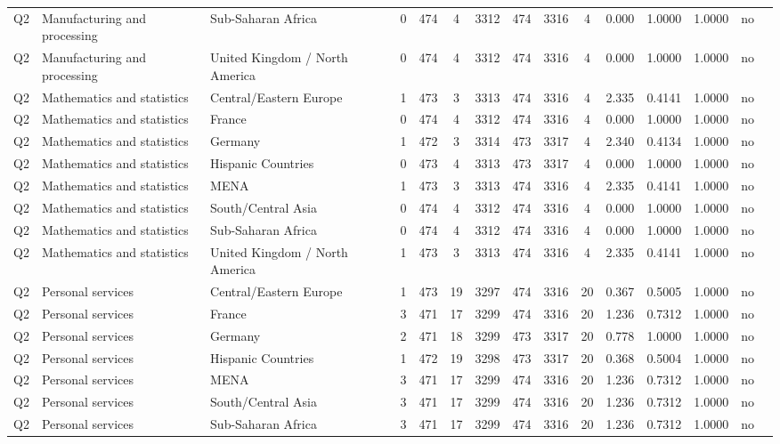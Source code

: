 \begin{longtable}{lllrcccccccccll}
Q2 & Manufacturing and processing & Sub-Saharan Africa & 0 & 474 & 4 & 3312 & 474 & 3316 & 4 & 0.000 & 1.0000 & 1.0000 & no \\
Q2 & Manufacturing and processing & United Kingdom / North America & 0 & 474 & 4 & 3312 & 474 & 3316 & 4 & 0.000 & 1.0000 & 1.0000 & no \\
Q2 & Mathematics and statistics & Central/Eastern Europe & 1 & 473 & 3 & 3313 & 474 & 3316 & 4 & 2.335 & 0.4141 & 1.0000 & no \\
Q2 & Mathematics and statistics & France & 0 & 474 & 4 & 3312 & 474 & 3316 & 4 & 0.000 & 1.0000 & 1.0000 & no \\
Q2 & Mathematics and statistics & Germany & 1 & 472 & 3 & 3314 & 473 & 3317 & 4 & 2.340 & 0.4134 & 1.0000 & no \\
Q2 & Mathematics and statistics & Hispanic Countries & 0 & 473 & 4 & 3313 & 473 & 3317 & 4 & 0.000 & 1.0000 & 1.0000 & no \\
Q2 & Mathematics and statistics & MENA & 1 & 473 & 3 & 3313 & 474 & 3316 & 4 & 2.335 & 0.4141 & 1.0000 & no \\
Q2 & Mathematics and statistics & South/Central Asia & 0 & 474 & 4 & 3312 & 474 & 3316 & 4 & 0.000 & 1.0000 & 1.0000 & no \\
Q2 & Mathematics and statistics & Sub-Saharan Africa & 0 & 474 & 4 & 3312 & 474 & 3316 & 4 & 0.000 & 1.0000 & 1.0000 & no \\
Q2 & Mathematics and statistics & United Kingdom / North America & 1 & 473 & 3 & 3313 & 474 & 3316 & 4 & 2.335 & 0.4141 & 1.0000 & no \\
Q2 & Personal services & Central/Eastern Europe & 1 & 473 & 19 & 3297 & 474 & 3316 & 20 & 0.367 & 0.5005 & 1.0000 & no \\
Q2 & Personal services & France & 3 & 471 & 17 & 3299 & 474 & 3316 & 20 & 1.236 & 0.7312 & 1.0000 & no \\
Q2 & Personal services & Germany & 2 & 471 & 18 & 3299 & 473 & 3317 & 20 & 0.778 & 1.0000 & 1.0000 & no \\
Q2 & Personal services & Hispanic Countries & 1 & 472 & 19 & 3298 & 473 & 3317 & 20 & 0.368 & 0.5004 & 1.0000 & no \\
Q2 & Personal services & MENA & 3 & 471 & 17 & 3299 & 474 & 3316 & 20 & 1.236 & 0.7312 & 1.0000 & no \\
Q2 & Personal services & South/Central Asia & 3 & 471 & 17 & 3299 & 474 & 3316 & 20 & 1.236 & 0.7312 & 1.0000 & no \\
Q2 & Personal services & Sub-Saharan Africa & 3 & 471 & 17 & 3299 & 474 & 3316 & 20 & 1.236 & 0.7312 & 1.0000 & no \\

\end{longtable}
